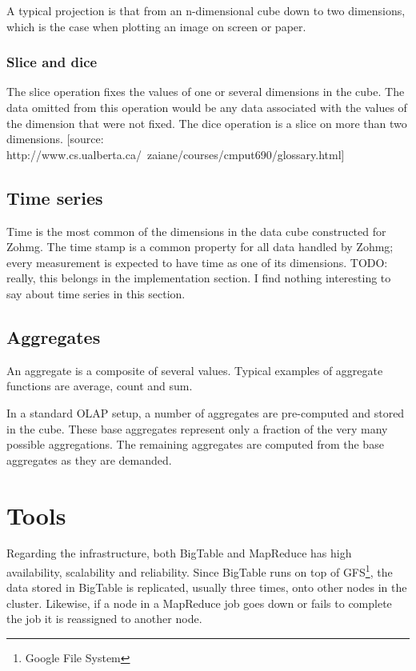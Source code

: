 \documentclass[a4paper,10pt]{book}
\begin{document}
A typical projection is that from an n-dimensional cube down to two dimensions, which is the case when plotting an image on screen or paper.


\subsection{Slice and dice}

The slice operation fixes the values of one or several dimensions in the cube. The data omitted from this operation would be any data associated with the values of the dimension that were not fixed. The dice operation is a slice on more than two dimensions. [source: http://www.cs.ualberta.ca/~zaiane/courses/cmput690/glossary.html]

\section{Time series}

Time is the most common of the dimensions in the data cube constructed for Zohmg. The time stamp is a common property for all data handled by Zohmg; every measurement is expected to have time as one of its dimensions. TODO: really, this belongs in the implementation section. I find nothing interesting to say about time series in this section.

\section{Aggregates}

An aggregate is a composite of several values. Typical examples of aggregate functions are average, count and sum.

In a standard OLAP setup, a number of aggregates are pre-computed and stored in the cube. These base aggregates represent only a fraction of the very many possible aggregations. The remaining aggregates are computed from the base aggregates as they are demanded.





\chapter{Tools}

Regarding the infrastructure, both BigTable and MapReduce has high
availability, scalability and reliability. Since BigTable runs on top of
GFS\footnote{Google File System}, the data stored in BigTable is
replicated, usually three times, onto other nodes in the cluster.
\cite{gfs} Likewise, if a node in a MapReduce job goes down or fails to
complete the job it is reassigned to another node. \cite{mapreduce}
\end{document}
